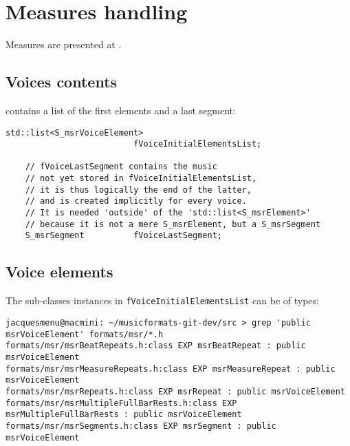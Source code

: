 
\chapter{Measures handling}\label{Measures handling}

Measures are presented at .


\section{Voices contents}

 contains a list of the first elements and a last segment:
\begin{lstlisting}[language=CPlusPlus]
    std::list<S_msrVoiceElement>
                          fVoiceInitialElementsList;

    // fVoiceLastSegment contains the music
    // not yet stored in fVoiceInitialElementsList,
    // it is thus logically the end of the latter,
    // and is created implicitly for every voice.
    // It is needed 'outside' of the 'std::list<S_msrElement>'
    // because it is not a mere S_msrElement, but a S_msrSegment
    S_msrSegment          fVoiceLastSegment;
\end{lstlisting}


\section{Voice elements}

The  sub-classes instances in {\tt fVoiceInitialElementsList} can be of types:
\begin{lstlisting}[language=Terminal]
jacquesmenu@macmini: ~/musicformats-git-dev/src > grep 'public msrVoiceElement' formats/msr/*.h
formats/msr/msrBeatRepeats.h:class EXP msrBeatRepeat : public msrVoiceElement
formats/msr/msrMeasureRepeats.h:class EXP msrMeasureRepeat : public msrVoiceElement
formats/msr/msrRepeats.h:class EXP msrRepeat : public msrVoiceElement
formats/msr/msrMultipleFullBarRests.h:class EXP msrMultipleFullBarRests : public msrVoiceElement
formats/msr/msrSegments.h:class EXP msrSegment : public msrVoiceElement
\end{lstlisting}

